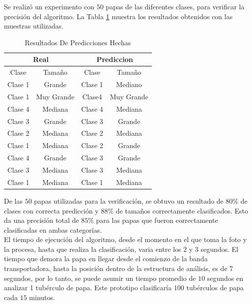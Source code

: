 Se realizó un experimento con $50$ papas de las diferentes clases, para verificar la precisión del algoritmo. La Tabla \ref{table:res} muestra los resultados obtenidos con las muestras utilizadas.

\newpage
\begin{table}[ht]
	\centering
	\begin{tabular}{|cc|cc|}
		\hline
		\multicolumn{2}{|c|}{Real}                 & \multicolumn{2}{c|}{Prediccion}           \\ \hline
		\multicolumn{1}{|c|}{Clase}   & Tamaño     & \multicolumn{1}{c|}{Clase}   & Tamaño     \\ \hline
		\multicolumn{1}{|c|}{Clase 1} & Grande     & \multicolumn{1}{c|}{Clase 1} & Mediano    \\ \hline
		\multicolumn{1}{|c|}{Clase 1} & Muy Grande & \multicolumn{1}{c|}{Clase4}  & Muy Grande \\ \hline
		\multicolumn{1}{|c|}{Clase 4} & Mediana    & \multicolumn{1}{c|}{Clase 4} & Mediana    \\ \hline
		\multicolumn{1}{|c|}{Clase 3} & Grande     & \multicolumn{1}{c|}{Clase 3} & Grande     \\ \hline
		\multicolumn{1}{|c|}{Clase 2} & Mediana    & \multicolumn{1}{c|}{Clase 2} & Mediana    \\ \hline
		\multicolumn{1}{|c|}{Clase 1} & Mediana    & \multicolumn{1}{c|}{Clase 2} & Grande     \\ \hline
		\multicolumn{1}{|c|}{Clase 4} & Grande     & \multicolumn{1}{c|}{Clase 3} & Grande     \\ \hline
		\multicolumn{1}{|c|}{Clase 3} & Mediana    & \multicolumn{1}{c|}{Clase 3} & Mediana    \\ \hline
		\multicolumn{1}{|c|}{Clase 1} & Mediana    & \multicolumn{1}{c|}{Clase 1} & Mediana    \\ \hline
	\end{tabular}
	\caption{Resultados De Predicciones Hechas}
	\label{table:res}
\end{table}


De las $50$ papas utilizadas para la verificación, se obtuvo un resultado de $80\%$ de clases con correcta predicción y $88\%$ de tamaños correctamente clasificados. Esto da una precisión total de $85\%$ para las papas que fueron correctamente clasificadas en ambas categorías.\\

El tiempo de ejecución del algoritmo, desde el momento en el que toma la foto y la procesa, hasta que realiza la clasificación, varia entre los $2$ y $3$ segundos. El tiempo que demora la papa en llegar desde el comienzo de la banda transportadora, hasta la posición dentro de la estructura de análisis, es de $7$ segundos, por lo tanto, se puede asumir un tiempo promedio de $10$ segundos en analizar 1 tubérculo de papa. Este prototipo clasificaría $100$ tubérculos de papa cada $15$ minutos.	 	

